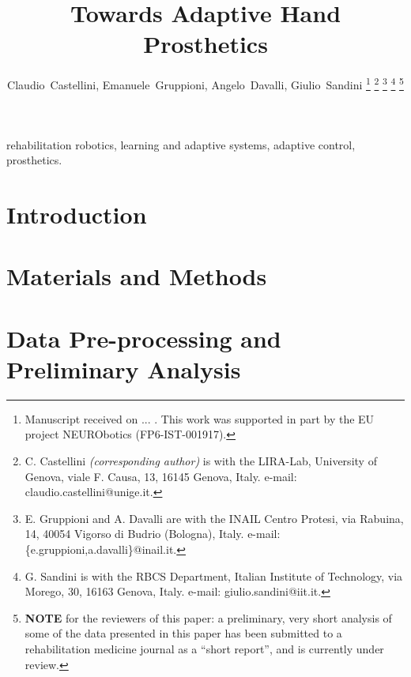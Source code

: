 \documentclass[journal]{IEEEtran}
\begin{document}
\title{Towards Adaptive Hand Prosthetics}

\author{Claudio~Castellini, Emanuele~Gruppioni, Angelo~Davalli, Giulio~Sandini%
\thanks{Manuscript received on ... . This work was supported in part
  by the EU project NEURObotics (FP6-IST-001917).}%
\thanks{C. Castellini \emph{(corresponding author)}
  is with the LIRA-Lab, University of Genova,
  viale F. Causa, 13, 16145 Genova, Italy.
  e-mail: claudio.castellini@unige.it.}%
\thanks{E. Gruppioni and A. Davalli
  are with the INAIL Centro Protesi,
  via Rabuina, 14, 40054 Vigorso di Budrio (Bologna), Italy.
  e-mail: \{e.gruppioni,a.davalli\}@inail.it.}%
\thanks{G. Sandini
  is with the RBCS Department, Italian Institute of Technology,
  via Morego, 30, 16163 Genova, Italy.
  e-mail: giulio.sandini@iit.it.}%
\thanks{\textbf{NOTE} for the reviewers of this paper: a preliminary,
  very short analysis of some of the data presented in this paper has
  been submitted to a rehabilitation medicine journal as a ``short
  report'', and is currently under review.}%
}

\maketitle

\begin{abstract}
  
\end{abstract}

\begin{IEEEkeywords}
  rehabilitation robotics, learning and adaptive systems, adaptive
  control, prosthetics.
\end{IEEEkeywords}

\IEEEpeerreviewmaketitle

\section{Introduction}
\label{sec:intro}


\section{Materials and Methods}
\label{sec:m&ms}


\section{Data Pre-processing and Preliminary Analysis}
\label{sec:pre}

\end{document}
